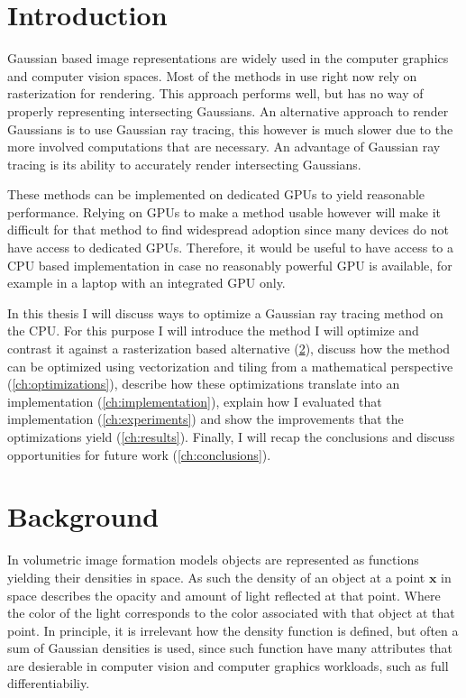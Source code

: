 \documentclass[a4paper, 11pt]{memoir}
\begin{document}
    \mainmatter
    \chapter{Introduction}
    Gaussian based image representations are widely used in the computer graphics and computer vision spaces. Most of
    the methods in use right now rely on rasterization for rendering. This approach performs well, but has no
    way of properly representing intersecting Gaussians. An alternative approach to render Gaussians is to use Gaussian
    ray tracing, this however is much slower due to the more involved computations that are necessary. An advantage of
    Gaussian ray tracing is its ability to accurately render intersecting Gaussians.

    These methods can be implemented on dedicated GPUs to yield reasonable performance. Relying on GPUs to make a method
    usable however will make it difficult for that method to find widespread adoption since many devices do not have
    access to dedicated GPUs. Therefore, it would be useful to have access to a CPU based implementation in case no reasonably
    powerful GPU is available, for example in a laptop with an integrated GPU only.

    In this thesis I will discuss ways to optimize a Gaussian ray tracing method on the CPU. For this purpose I will
    introduce the method I will optimize and contrast it against a rasterization based alternative (\ref{ch:background}),
    discuss how the method can be optimized using vectorization and tiling from a mathematical perspective
    (\ref{ch:optimizations}), describe how these optimizations translate into an implementation (\ref{ch:implementation}),
    explain how I evaluated that implementation (\ref{ch:experiments})
    and show the improvements that the optimizations yield (\ref{ch:results}). Finally, I will recap the conclusions and
    discuss opportunities for future work (\ref{ch:conclusions}).

    \chapter{Background}
    \label{ch:background}
    In volumetric image formation models objects are represented as functions yielding their densities in space. As such the
    density of an object at a point $\mathbf{x}$ in space describes the opacity and amount of light reflected at that
    point. Where the color of the light corresponds to the color associated with that object at that point. In principle,
    it is irrelevant how the density function is defined, but often a sum of Gaussian densities is used, since such function
    have many attributes that are desierable in computer vision and computer graphics workloads, such as full differentiabiliy.
\end{document}
